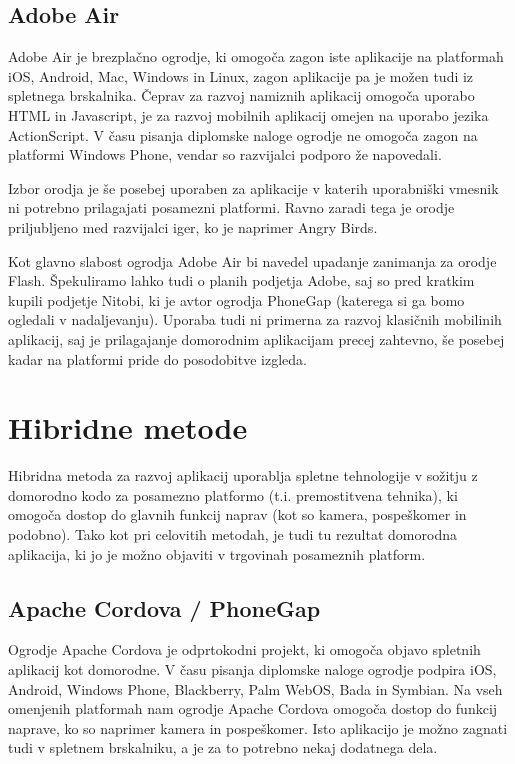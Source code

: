 \subsection{Adobe Air}

Adobe Air\cite{adobeair} je brezplačno ogrodje, ki omogoča zagon iste aplikacije na platformah iOS, Android, Mac, Windows in Linux, zagon aplikacije pa je možen tudi iz spletnega brskalnika. Čeprav za razvoj namiznih aplikacij omogoča uporabo HTML in Javascript, je za razvoj mobilnih aplikacij omejen na uporabo jezika ActionScript. V času pisanja diplomske naloge ogrodje ne omogoča zagon na platformi Windows Phone, vendar so razvijalci podporo že napovedali.

Izbor orodja je še posebej uporaben za aplikacije v katerih uporabniški vmesnik ni potrebno prilagajati posamezni platformi. Ravno zaradi tega je orodje priljubljeno med razvijalci iger, ko je naprimer Angry Birds\cite{angrybirds}.

Kot glavno slabost ogrodja Adobe Air bi navedel upadanje zanimanja za orodje Flash. Špekuliramo lahko tudi o planih podjetja Adobe, saj so pred kratkim kupili podjetje Nitobi, ki je avtor ogrodja PhoneGap (katerega si ga bomo ogledali v nadaljevanju). Uporaba tudi ni primerna za razvoj klasičnih mobilinih aplikacij, saj je prilagajanje domorodnim aplikacijam precej zahtevno, še posebej kadar na platformi pride do posodobitve izgleda.

\section{Hibridne metode}

Hibridna metoda za razvoj aplikacij uporablja spletne tehnologije v sožitju z domorodno kodo za posamezno platformo (t.i. premostitvena tehnika), ki omogoča dostop do glavnih funkcij naprav (kot so kamera, pospeškomer in podobno). Tako kot pri celovitih metodah, je tudi tu rezultat domorodna aplikacija, ki jo je možno objaviti v trgovinah posameznih platform.

\subsection{Apache Cordova / PhoneGap}

Ogrodje Apache Cordova\cite{cordova} je odprtokodni projekt, ki omogoča objavo spletnih aplikacij kot domorodne. V času pisanja diplomske naloge ogrodje podpira iOS, Android, Windows Phone, Blackberry, Palm WebOS, Bada in Symbian. Na vseh omenjenih platformah nam ogrodje Apache Cordova omogoča dostop do funkcij naprave, ko so naprimer kamera in pospeškomer. Isto aplikacijo je možno zagnati tudi v spletnem brskalniku, a je za to potrebno nekaj dodatnega dela.

